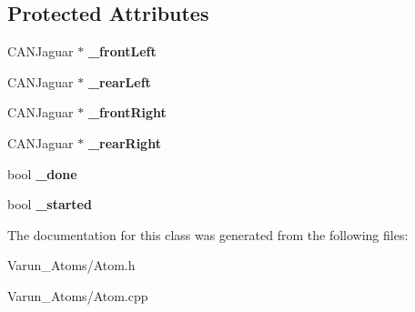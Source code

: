 \subsection*{Protected Attributes}
\begin{DoxyCompactItemize}
\item 
\hypertarget{class_atom_a8b9a3812a495585b246b569d976722ee}{C\-A\-N\-Jaguar $\ast$ {\bfseries \-\_\-front\-Left}}\label{class_atom_a8b9a3812a495585b246b569d976722ee}

\item 
\hypertarget{class_atom_a1dbf54b07a056e8a7e0a9e5ce9013e03}{C\-A\-N\-Jaguar $\ast$ {\bfseries \-\_\-rear\-Left}}\label{class_atom_a1dbf54b07a056e8a7e0a9e5ce9013e03}

\item 
\hypertarget{class_atom_aa8930a2b7b54aa581274033899f7761d}{C\-A\-N\-Jaguar $\ast$ {\bfseries \-\_\-front\-Right}}\label{class_atom_aa8930a2b7b54aa581274033899f7761d}

\item 
\hypertarget{class_atom_a69d083ed75359c1eab8b3054a6fab0e2}{C\-A\-N\-Jaguar $\ast$ {\bfseries \-\_\-rear\-Right}}\label{class_atom_a69d083ed75359c1eab8b3054a6fab0e2}

\item 
\hypertarget{class_atom_a4a17c1192d97b4d5a32e75d3e58f0f63}{bool {\bfseries \-\_\-done}}\label{class_atom_a4a17c1192d97b4d5a32e75d3e58f0f63}

\item 
\hypertarget{class_atom_aa2099b75919bcbe34e95cbb5f1837956}{bool {\bfseries \-\_\-started}}\label{class_atom_aa2099b75919bcbe34e95cbb5f1837956}

\end{DoxyCompactItemize}


The documentation for this class was generated from the following files\-:\begin{DoxyCompactItemize}
\item 
Varun\-\_\-\-Atoms/Atom.\-h\item 
Varun\-\_\-\-Atoms/Atom.\-cpp\end{DoxyCompactItemize}
